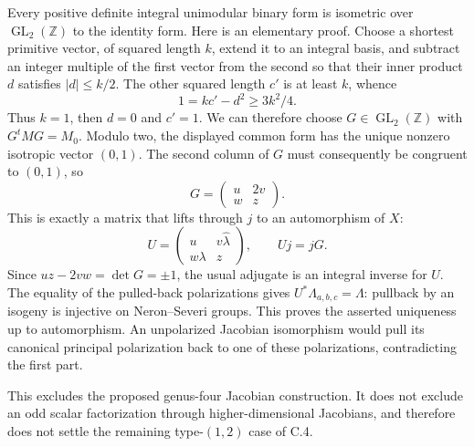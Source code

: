 Every positive definite integral unimodular binary
form is isometric over $\operatorname{GL}_2(\mathbb Z)$
to the identity form. Here is an elementary proof.
Choose a shortest primitive vector, of squared length
$k$, extend it to an integral basis, and subtract an
integer multiple of the first vector from the second
so that their inner product $d$ satisfies $|d|\le k/2$.
The other squared length $c'$ is at least $k$, whence
\[
             1=kc'-d^2\ge 3k^2/4.
\]
Thus $k=1$, then $d=0$ and $c'=1$.
We can therefore choose $G\in\operatorname{GL}_2(\mathbb Z)$
with $G^tMG=M_0$. Modulo two, the displayed common form
has the unique nonzero isotropic vector $(0,1)$.
The second column of $G$ must consequently be congruent
to $(0,1)$, so
\[
                  G=\begin{pmatrix}u&2v\\w&z\end{pmatrix}.
\]
This is exactly a matrix that lifts through $j$ to
an automorphism of $X$:
\[
 U=\begin{pmatrix}u&v\widehat\lambda\\w\lambda&z\end{pmatrix},
 \qquad Uj=jG.
\]
Since $uz-2vw=\det G=\pm1$, the usual adjugate is an
integral inverse for $U$. The equality of the pulled-back
polarizations gives $U^*\Lambda_{a,b,c}=\Lambda$:
pullback by an isogeny is injective on Neron--Severi groups.
This proves the asserted uniqueness up to automorphism.
An unpolarized Jacobian isomorphism would pull its canonical
principal polarization back to one of these polarizations,
contradicting the first part.

This excludes the proposed genus-four Jacobian construction.
It does not exclude an odd scalar factorization through
higher-dimensional Jacobians, and therefore does not
settle the remaining type-$(1,2)$ case of C.4.
